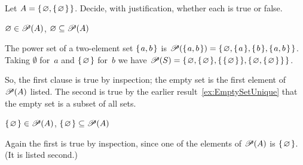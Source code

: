 \documentclass{ibl}  %
\begin{document}
\begin{problem}  
Let $A=\set{\emptyset,\set{\emptyset}}$.
Decide, with justification, whether each is true or false.
\begin{exes}
\begin{exercise} 
  $\emptyset\in\powerset(A)$, 
  $\emptyset\subseteq\powerset(A)$    
\end{exercise}
\begin{answer}
The power set of a two-element set $\set{a,b}$ is 
$\powerset(\set{a,b})=\set{\emptyset,\set{a},\set{b},\set{a,b}}$.
Taking $\emptyset$ for~$a$ and $\set{\emptyset}$ for~$b$ we have
$\powerset(S)=\set{\emptyset, \set{\emptyset}, \set{\set{\emptyset}}, 
                   \set{\emptyset, \set{\emptyset}}}$.

  So, the first clause is true by inspection; 
  the empty set is the first element
  of $\powerset(A)$ listed.
  The second is true by the earlier result~\ref{ex:EmptySetUnique}
  that the empty set is a subset of all sets.
\end{answer}
\begin{exercise} 
  $\set{\emptyset}\in\powerset(A)$, 
  $\set{\emptyset}\subseteq\powerset(A)$    
\end{exercise}
\begin{answer}
  Again the first is true by inspection, 
  since one of the elements of $\powerset(A)$ is 
  $\set{\emptyset}$.  (It is listed second.)


\end{answer}
\end{exes}
\end{problem}
\end{document}
